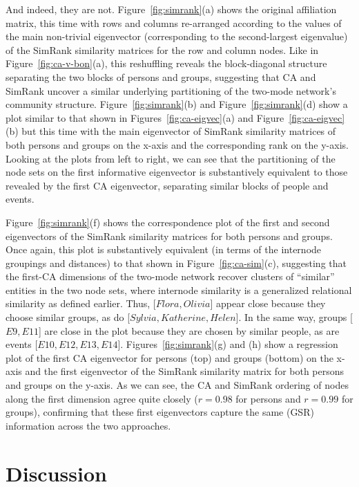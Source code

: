 \documentclass[a4paper,fleqn]{cas-sc}
\begin{document}
And indeed, they are not. Figure~\ref{fig:simrank}(a) shows the original affiliation matrix, this time with rows and columns re-arranged according to the values of the main non-trivial eigenvector (corresponding to the second-largest eigenvalue) of the SimRank similarity matrices for the row and column nodes. Like in Figure~\ref{fig:ca-v-bon}(a), this reshuffling reveals the block-diagonal structure separating the two blocks of persons and groups, suggesting that CA and SimRank uncover a similar underlying partitioning of the two-mode network's community structure. Figure~\ref{fig:simrank}(b) and Figure~\ref{fig:simrank}(d) show a plot similar to that shown in Figures~\ref{fig:ca-eigvec}(a) and Figure~\ref{fig:ca-eigvec}(b) but this time with the main eigenvector of SimRank similarity matrices of both persons and groups on the x-axis and the corresponding rank on the y-axis. Looking at the plots from left to right, we can see that the partitioning of the node sets on the first informative eigenvector is substantively equivalent to those revealed by the first CA eigenvector, separating similar blocks of people and events.  

Figure~\ref{fig:simrank}(f) shows the correspondence plot of the first and second eigenvectors of the SimRank similarity matrices for both persons and groups. Once again, this plot is substantively equivalent (in terms of the internode groupings and distances) to that shown in Figure~\ref{fig:ca-sim}(c), suggesting that the first-CA dimensions of the two-mode network recover clusters of ``similar'' entities in the two node sets, where internode similarity is a generalized relational similarity as defined earlier. Thus, [$Flora, Olivia$] appear close because they choose similar groups, as do [$Sylvia, Katherine, Helen$]. In the same way, groups [$E9, E11$] are close in the plot because they are chosen by similar people, as are events [$E10, E12, E13, E14$]. Figures~\ref{fig:simrank}(g) and (h) show a regression plot of the first CA eigenvector for persons (top) and groups (bottom) on the x-axis and the first eigenvector of the SimRank similarity matrix for both persons and groups on the y-axis. As we can see, the CA and SimRank ordering of nodes along the first dimension agree quite closely ($r = 0.98$ for persons and $r = 0.99$ for groups), confirming that these first eigenvectors capture the same (GSR) information across the two approaches. 

\section{Discussion}
%


\end{document}
